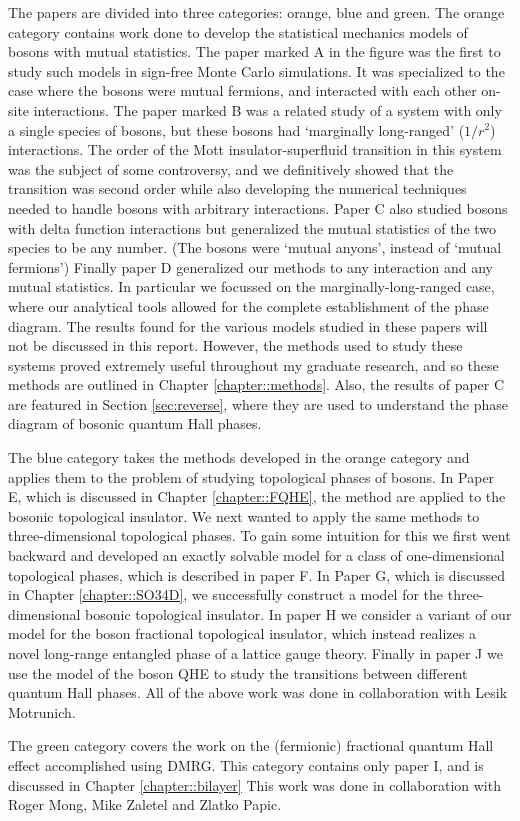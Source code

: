The papers are divided into three categories: orange, blue and green. The orange category contains work done to develop the statistical mechanics models of bosons with mutual statistics. The paper marked A \cite{Loopy} in the figure was the first to study such models in sign-free Monte Carlo simulations. It was specialized to the case where the bosons were mutual fermions, and interacted with each other on-site interactions. 
The paper marked B\cite{Ranged_Loops} was a related study of a system with only a single species of bosons, but these bosons had `marginally long-ranged' ($1/r^2$) interactions. The order of the Mott insulator-superfluid transition in this system was the subject of some controversy, and we definitively showed that the transition was second order while also developing the numerical techniques needed to handle bosons with arbitrary interactions. 
Paper C\cite{short_range3} also studied bosons with delta function interactions but generalized the mutual statistics of the two species to be any number. (The bosons were `mutual anyons', instead of `mutual fermions') 
Finally paper D\cite{Gen2Loops} generalized our methods to any interaction and any mutual statistics. In particular we focussed on the marginally-long-ranged case, where our analytical tools allowed for the complete establishment of the phase diagram. The results found for the various models studied in these papers will not be discussed in this report. However, the methods used to study these systems proved extremely useful throughout my graduate research, and so these methods are outlined in Chapter \ref{chapter::methods}. Also, the results of paper C are featured in Section \ref{sec:reverse}, where they are used to understand the phase diagram of bosonic quantum Hall phases.

The blue category takes the methods developed in the orange category and applies them to the problem of studying topological phases of bosons. In Paper E\cite{FQHE}, which is discussed in Chapter \ref{chapter::FQHE}, the method are applied to the bosonic topological insulator. We next wanted to apply the same methods to three-dimensional topological phases. To gain some intuition for this we first went backward and developed an exactly solvable model for a class of one-dimensional topological phases, which is described in paper F\cite{1DSPT}. In Paper G\cite{SO34D}, which is discussed in Chapter \ref{chapter::SO34D}, we successfully construct a model for the three-dimensional bosonic topological insulator. In paper H\cite{FracFaraday} we consider a variant of our model for the boson fractional topological insulator, which instead realizes a novel long-range entangled phase of a lattice gauge theory. Finally in paper J\cite{JongYeon} we use the model of the boson QHE to study the transitions between different quantum Hall phases. All of the above work was done in collaboration with Lesik Motrunich.

The green category covers the work on the (fermionic) fractional quantum Hall effect accomplished using DMRG. This category contains only paper I\cite{bilayer}, and is discussed in Chapter \ref{chapter::bilayer} This work was done in collaboration with Roger Mong, Mike Zaletel and Zlatko Papic.
